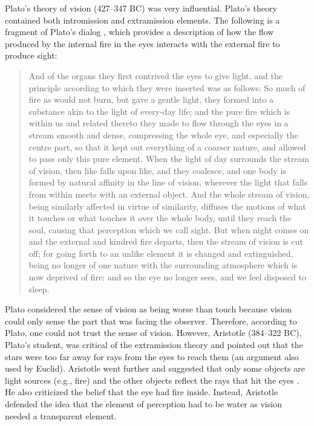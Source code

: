 Plato’s theory of vision (427--347 BC) was very influential. Plato's theory contained both intromission and extramission elements. The following is a fragment of Plato's dialog  \cite{Plato360bc}, which provides a description of how the flow produced by the internal fire in the eyes interacts with the external fire to produce sight:


\begin{quote}
    And of the organs they first contrived the eyes to give light, and the principle according to which
    they were inserted was as follows: So much of fire as would not burn,
    but gave a gentle light, they formed into a substance akin to the
    light of every-day life; and the pure fire which is within us and
    related thereto they made to flow through the eyes in a stream smooth
    and dense, compressing the whole eye, and especially the centre part,
    so that it kept out everything of a coarser nature, and allowed to
    pass only this pure element. When the light of day surrounds the stream
    of vision, then like falls upon like, and they coalesce, and one body
    is formed by natural affinity in the line of vision, wherever the
    light that falls from within meets with an external object. And the
    whole stream of vision, being similarly affected in virtue of similarity,
    diffuses the motions of what it touches or what touches it over the
    whole body, until they reach the soul, causing that perception which
    we call sight. But when night comes on and the external and kindred
    fire departs, then the stream of vision is cut off; for going forth
    to an unlike element it is changed and extinguished, being no longer
    of one nature with the surrounding atmosphere which is now deprived
    of fire: and so the eye no longer sees, and we feel disposed to sleep.
\end{quote}


Plato considered the sense of vision as being worse than touch because vision could only sense the part that was facing the observer. Therefore, according to Plato, one could not trust the sense of vision. However, Aristotle (384--322 BC), Plato's student, was critical of the extramission theory and pointed out that the stars were too far away for rays from the eyes to reach them (an argument also used by Euclid). Aristotle went further and suggested that only some objects are light sources (e.g., fire) and the other objects reflect the rays that hit the eyes \cite{Aristotle350bc}. He also criticized the belief that the eye had fire inside. Instead, Aristotle defended the idea that the element of perception had to be water as vision needed a transparent element.


